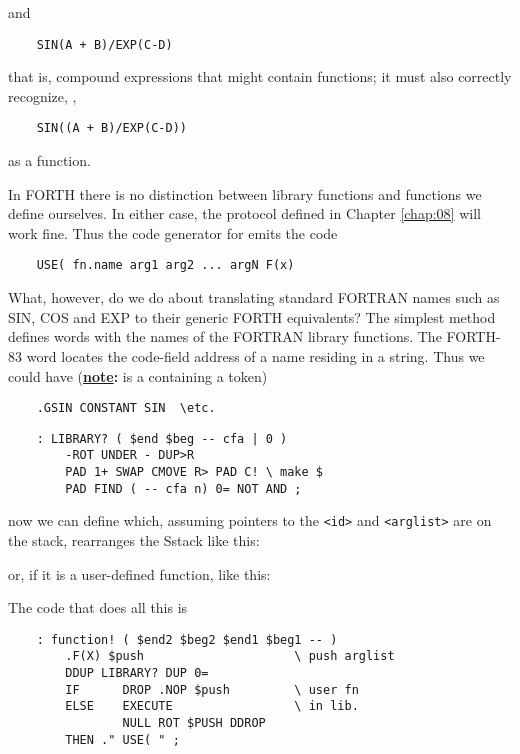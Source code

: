 and

\begin{lstlisting}
    SIN(A + B)/EXP(C-D)
\end{lstlisting}

that is, compound expressions that might contain functions; it must also correctly recognize, \eg,

\begin{lstlisting}
    SIN((A + B)/EXP(C-D))
\end{lstlisting}

as a function.

In FORTH there is no distinction between library functions and functions we define ourselves. In either case, the protocol defined in Chapter \ref{chap:08} will work fine. Thus the code generator for  emits the code

\begin{lstlisting}
    USE( fn.name arg1 arg2 ... argN F(x)
\end{lstlisting}

What, however, do we do about translating standard FORTRAN names such as SIN, COS and EXP to their generic FORTH equivalents? The simplest method defines words with the names of the FORTRAN library functions. The FORTH-83 word  locates the code-field address of a name residing in a string. Thus we could have (\textbf{\underline{note}:}  is a  containing a token)

\begin{lstlisting}
    .GSIN CONSTANT SIN  \etc.
\end{lstlisting}

\begin{lstlisting}
    : LIBRARY? ( $end $beg -- cfa | 0 )
        -ROT UNDER - DUP>R
        PAD 1+ SWAP CMOVE R> PAD C! \ make $
        PAD FIND ( -- cfa n) 0= NOT AND ;
\end{lstlisting}

now we can define  which, assuming pointers to the \texttt{<id>} and \texttt{<arglist>} are on the stack, rearranges the Sstack like this:

or, if it is a user-defined function, like this:

The code that does all this is

\begin{lstlisting}
    : function! ( $end2 $beg2 $end1 $beg1 -- )
        .F(X) $push                     \ push arglist
        DDUP LIBRARY? DUP 0=
        IF      DROP .NOP $push         \ user fn
        ELSE    EXECUTE                 \ in lib.
                NULL ROT $PUSH DDROP
        THEN ." USE( " ;
\end{lstlisting}

